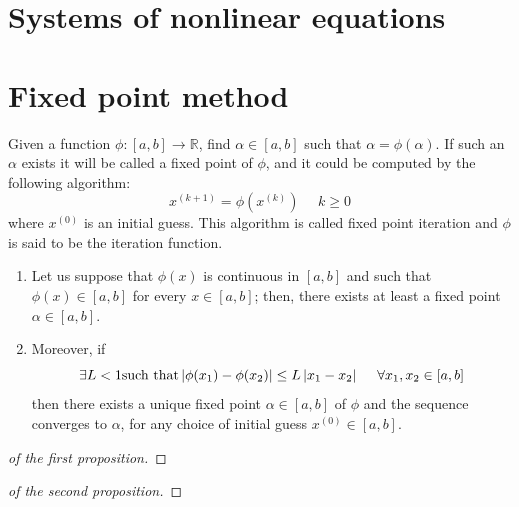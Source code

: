 \documentclass[12pt, a4paper]{report}
\newtheorem[style=M,bodystyle=\normalfont]{theorem}{Theorem}
\newtheorem[style=M,bodystyle=\normalfont]{corollary}{Corollary}
\newtheorem[style=M,bodystyle=\normalfont]{lemma}{Lemma}
\newtheorem[style=M,bodystyle=\normalfont]{definition}{Definition}
\begin{document}
    \section{Systems of nonlinear equations}

    \section{Fixed point method}
    Given a function $\phi:[a,b] \rightarrow \mathbb{R}$, find $\alpha \in [a,b]$ such that $\alpha=\phi(\alpha)$. If such an $\alpha$ exists it will be called a fixed point of 
    $\phi$, and it could be computed by the following algorithm: 
    \[x^{(k+1)}=\phi(x^{(k)}) \:\:\:\:\:\: k \geq 0\]
    where $x^{(0)}$ is an initial guess. This algorithm is called fixed point iteration and $\phi$ is said to be the iteration function. 
    \begin{theorem}
        \begin{enumerate}
            \item Let us suppose that $\phi(x)$ is continuous in $[a,b]$ and such that $\phi(x) \in [a,b]$ for every $x \in [a,b]$; then, there exists at least a fixed point 
                $\alpha \in [a,b]$.
            \item Moreover, if 
                \[\exists L < 1 \textnormal{such that} \left\lvert \phi(x_1)-\phi(x_2) \right\rvert \leq L\left\lvert x_1-x_2 \right\rvert  \:\:\:\:\:\: \forall x_1,x_2 \in [a,b]\]
                then there exists a unique fixed point $\alpha \in [a,b]$ of $\phi$ and the sequence converges to $\alpha$, for any choice of initial guess $x^{(0)} \in [a,b]$.
        \end{enumerate}
    \end{theorem}
    \begin{proof}[of the first proposition]
        
    \end{proof}
    \begin{proof}[of the second proposition]
        
    \end{proof}
\end{document}
